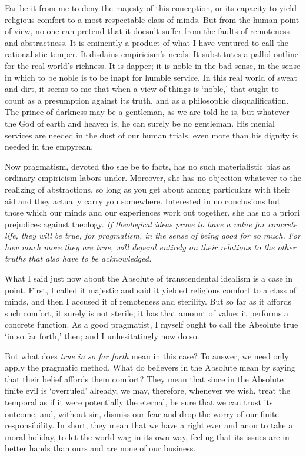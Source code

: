 \documentclass[]{article}
\begin{document}
Far be it from me to deny the majesty of this conception, or its
capacity to yield religious comfort to a most respectable class of
minds. But from the human point of view, no one can pretend that it
doesn't suffer from the faults of remoteness and abstractness. It is
eminently a product of what I have ventured to call the rationalistic
temper. It disdains empiricism's needs. It substitutes a pallid outline
for the real world's richness. It is dapper; it is noble in the bad
sense, in the sense in which to be noble is to be inapt for humble
service. In this real world of sweat and dirt, it seems to me that
when a view of things is `noble,' that ought to count as a presumption
against its truth, and as a philosophic disqualification. The prince of
darkness may be a gentleman, as we are told he is, but whatever the
God of earth and heaven is, he can surely be no gentleman. His menial
services are needed in the dust of our human trials, even more than his
dignity is needed in the empyrean.

Now pragmatism, devoted tho she be to facts, has no such materialistic
bias as ordinary empiricism labors under. Moreover, she has no objection
whatever to the realizing of abstractions, so long as you get about
among particulars with their aid and they actually carry you somewhere.
Interested in no conclusions but those which our minds and our
experiences work out together, she has no a priori prejudices against
theology. \emph{If theological ideas prove to have a value for concrete life,
they will be true, for pragmatism, in the sense of being good for so
much. For how much more they are true, will depend entirely on their
relations to the other truths that also have to be acknowledged.}

What I said just now about the Absolute of transcendental idealism is a
case in point. First, I called it majestic and said it yielded religious
comfort to a class of minds, and then I accused it of remoteness and
sterility. But so far as it affords such comfort, it surely is not
sterile; it has that amount of value; it performs a concrete function.
As a good pragmatist, I myself ought to call the Absolute true `in so
far forth,' then; and I unhesitatingly now do so.

But what does \emph{true in so far forth} mean in this case? To answer, we need
only apply the pragmatic method. What do believers in the Absolute mean
by saying that their belief affords them comfort? They mean that since
in the Absolute finite evil is `overruled' already, we may, therefore,
whenever we wish, treat the temporal as if it were potentially the
eternal, be sure that we can trust its outcome, and, without sin,
dismiss our fear and drop the worry of our finite responsibility. In
short, they mean that we have a right ever and anon to take a moral
holiday, to let the world wag in its own way, feeling that its issues
are in better hands than ours and are none of our business.
\end{document}
